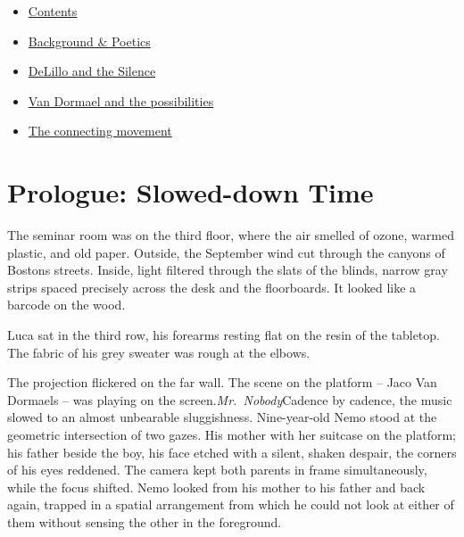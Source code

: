 \documentclass[
  ngerman,
]{article}
\providecommand{\tightlist}{%
  \setlength{\itemsep}{0pt}\setlength{\parskip}{0pt}}
\begin{document}
\begin{itemize}
  \begin{itemize}
  \tightlist
  \item
    \protect{}\label{toc-contents}\hyperref[contents]{Contents}
  \item
    \protect{}\label{toc-background-poetics}\hyperref[background-poetics]{Background
    \& Poetics}
  \item
    \protect{}\label{toc-delillo-and-the-silence}\hyperref[delillo-and-the-silence]{DeLillo
    and the Silence}
  \item
    \protect{}\label{toc-van-dormael-and-the-possibilities}\hyperref[van-dormael-and-the-possibilities]{Van
    Dormael and the possibilities}
  \item
    \protect{}\label{toc-the-connecting-movement}\hyperref[the-connecting-movement]{The
    connecting movement}
  \end{itemize}
\end{itemize}

\section{Prologue: Slowed-down Time}\label{prologue-slowed-down-time}

The seminar room was on the third floor, where the air smelled of ozone,
warmed plastic, and old paper. Outside, the September wind cut through
the canyons of Boston\textquotesingle s streets. Inside, light filtered
through the slats of the blinds, narrow gray strips spaced precisely
across the desk and the floorboards. It looked like a barcode on the
wood.

Luca sat in the third row, his forearms resting flat on the resin of the
tabletop. The fabric of his grey sweater was rough at the elbows.

The projection flickered on the far wall. The scene on the platform --
Jaco Van Dormaels -- was playing on the screen.\emph{Mr.~Nobody}Cadence
by cadence, the music slowed to an almost unbearable sluggishness.
Nine-year-old Nemo stood at the geometric intersection of two gazes. His
mother with her suitcase on the platform; his father beside the boy, his
face etched with a silent, shaken despair, the corners of his eyes
reddened. The camera kept both parents in frame simultaneously, while
the focus shifted. Nemo looked from his mother to his father and back
again, trapped in a spatial arrangement from which he could not look at
either of them without sensing the other in the foreground.
\end{document}
